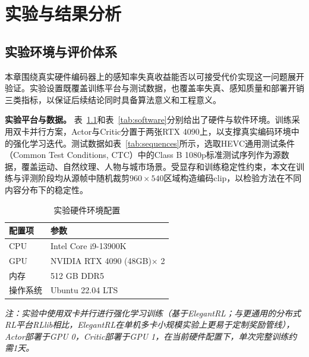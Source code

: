 ﻿\chapter{实验与结果分析}

\section{实验环境与评价体系}

本章围绕真实硬件编码器上的感知率失真收益能否以可接受代价实现这一问题展开验证。实验设置既覆盖训练平台与测试数据，也覆盖率失真、感知质量和部署开销三类指标，以保证后续结论同时具备算法意义和工程意义。

\textbf{实验平台与数据。} 表~\ref{tab:hardware}和表~\ref{tab:software}分别给出了硬件与软件环境。训练采用双卡并行方案，Actor与Critic分置于两张RTX 4090上，以支撑真实编码环境中的强化学习迭代。测试数据如表~\ref{tab:sequences}所示，选取HEVC通用测试条件（Common Test Conditions, CTC）中的Class B 1080p标准测试序列\cite{ref-bossen2013ctc}作为源数据，覆盖运动、自然纹理、人物与城市场景。受显存和训练稳定性约束，本文在训练与评测阶段均从源帧中随机裁剪$960\times540$区域构造编码clip，以检验方法在不同内容分布下的稳定性。

\begin{table}[htbp]
  \centering
  \caption{实验硬件环境配置}
  \label{tab:hardware}
  \begin{tabular}{ll}
    \toprule
    \textbf{配置项} & \textbf{参数} \\
    \midrule
    CPU         & Intel Core i9-13900K \\
    GPU         & NVIDIA RTX 4090 (48GB)$\times$ 2 \\
    内存        & 512 GB DDR5 \\
    操作系统    & Ubuntu 22.04 LTS \\
    \bottomrule
  \end{tabular}
  \vspace{2pt}
  \begin{flushleft}
    \small \textit{注：实验中使用双卡并行进行强化学习训练（基于ElegantRL\cite{ref26-liu2021elegantrl}；与更通用的分布式RL平台RLlib\cite{ref63-liang2018rllib}相比，ElegantRL在单机多卡小规模实验上更易于定制奖励管线），Actor部署于GPU 0，Critic部署于GPU 1，在当前硬件配置下，单次完整训练约需1天。}
  \end{flushleft}
\end{table}

